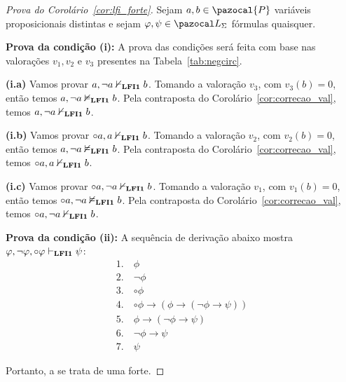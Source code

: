         \begin{proof}[Prova do Corolário~\ref{cor:lfi_forte}]
            Sejam $a, b \in \pazocal{P}$ variáveis proposicionais distintas e sejam $\phi, \psi \in \ling{}$ fórmulas quaisquer.

            \begin{adjustwidth}{1cm}{}

                \noindent\textbf{Prova da condição (i):} A prova das condições será feita com base nas valorações $v_1, v_2$ e $v_3$ presentes na Tabela~\ref{tab:negcirc}.
        
                \begin{adjustwidth}{1cm}{}

                    \textbf{(i.a)} Vamos provar $a, \neg a \nvdash_{{\normalfont\textbf{LFI1}}{}} b$. Tomando a valoração $v_3$, com $v_3(b) = 0$, então temos $a, \neg a \nvDash_{{\normalfont\textbf{LFI1}}{}} b$. Pela contraposta do Corolário~\ref{cor:correcao_val}, temos  $a, \neg a \nvdash_{{\normalfont\textbf{LFI1}}{}} b$.

                    \noindent\textbf{(i.b)} Vamos provar $\circ a, a \nvdash_{{\normalfont\textbf{LFI1}}{}} b$. Tomando a valoração $v_2$, com $v_2(b) = 0$, então temos $a, \neg a \nvDash_{{\normalfont\textbf{LFI1}}{}} b$. Pela contraposta do Corolário~\ref{cor:correcao_val}, temos $\circ a, a \nvdash_{{\normalfont\textbf{LFI1}}{}} b$.

                    \noindent\textbf{(i.c)} Vamos provar $\circ a, \neg a \nvdash_{{\normalfont\textbf{LFI1}}{}} b$. Tomando a valoração $v_1$, com $v_1(b) = 0$, então temos $\circ a, \neg a \nvDash_{{\normalfont\textbf{LFI1}}{}} b$. Pela contraposta do Corolário~\ref{cor:correcao_val}, temos $\circ a, \neg a \nvdash_{{\normalfont\textbf{LFI1}}{}} b$.
                \end{adjustwidth}
        
                \noindent\textbf{Prova da condição (ii):} A sequência de derivação abaixo mostra $\varphi, \neg \varphi, \circ \varphi \vdash_{{\normalfont\textbf{LFI1}}{}} \psi$:
                \begin{align*}
                    1.~ & \phi \tag{Premissa}       \\
                    2.~ & \neg \phi \tag{Premissa}  \\
                    3.~ & \circ \phi \tag{Premissa} \\
                    4.~ & \circ \phi \to (\phi \to (\neg \phi \to \psi)) \tag{bc1} \\
                    5.~ & \phi \to (\neg \phi \to \psi) \tag{MP 3, 4} \\
                    6.~ & \neg \phi \to \psi \tag{MP 1, 5} \\
                    7.~ & \psi \tag{MP 2, 6}
                \end{align*}

            \end{adjustwidth}


            Portanto, a \lfium{} se trata de uma \lfi{} forte.
        \end{proof}

